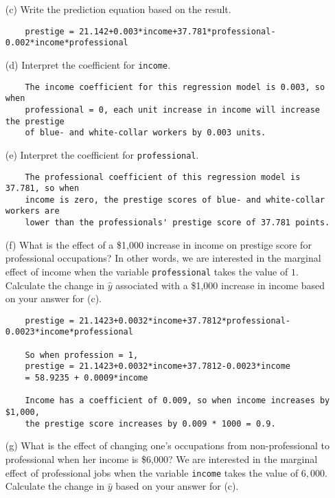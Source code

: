 \documentclass[12pt,letterpaper]{article}
\begin{document}
\begin{enumerate}
\newpage
	\item [(c)]
	Write the prediction equation based on the result.
	
	\begin{verbatim}
	prestige = 21.142+0.003*income+37.781*professional-0.002*income*professional
	\end{verbatim} 

	\item [(d)]
	Interpret the coefficient for \texttt{income}.
	
	\begin{verbatim}
	The income coefficient for this regression model is 0.003, so when 
	professional = 0, each unit increase in income will increase the prestige 
	of blue- and white-collar workers by 0.003 units.
	\end{verbatim} 
	
	\item [(e)]
	Interpret the coefficient for \texttt{professional}.
	
	\begin{verbatim}
	The professional coefficient of this regression model is 37.781, so when 
	income is zero, the prestige scores of blue- and white-collar workers are 
	lower than the professionals' prestige score of 37.781 points.
	\end{verbatim} 
	
	\item [(f)]
	What is the effect of a \$1,000 increase in income on prestige score for professional occupations? In other words, we are interested in the marginal effect of income when the variable \texttt{professional} takes the value of $1$. Calculate the change in $\hat{y}$ associated with a \$1,000 increase in income based on your answer for (c).
	
	\begin{verbatim}
	prestige = 21.1423+0.0032*income+37.7812*professional-0.0023*income*professional
	
	So when profession = 1,
	prestige = 21.1423+0.0032*income+37.7812-0.0023*income
	= 58.9235 + 0.0009*income
	
	Income has a coefficient of 0.009, so when income increases by $1,000, 
	the prestige score increases by 0.009 * 1000 = 0.9.
	\end{verbatim} 
	
\newpage	
	\item [(g)]
	What is the effect of changing one's occupations from non-professional to professional when her income is \$6,000? We are interested in the marginal effect of professional jobs when the variable \texttt{income} takes the value of $6,000$. Calculate the change in $\hat{y}$ based on your answer for (c).
	

\end{enumerate}
\end{document}
